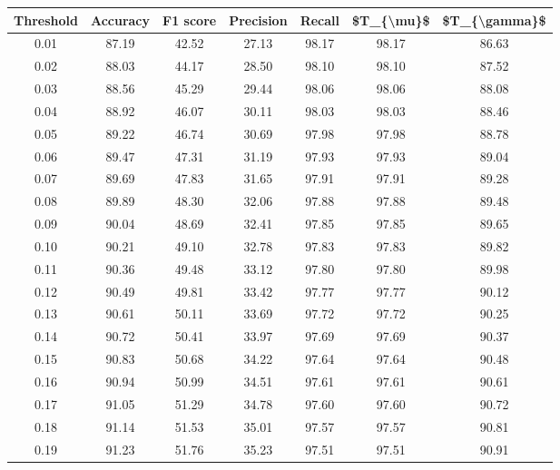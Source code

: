 \begin{tabular}{|c|c|c|c|c|c|c|}
\hline
 Threshold &  Accuracy &  F1 score &  Precision &  Recall &  \$T\_\{\textbackslash mu\}\$ &  \$T\_\{\textbackslash gamma\}\$ \\
\hline
      0.01 &     87.19 &     42.52 &      27.13 &   98.17 &      98.17 &         86.63 \\
      0.02 &     88.03 &     44.17 &      28.50 &   98.10 &      98.10 &         87.52 \\
      0.03 &     88.56 &     45.29 &      29.44 &   98.06 &      98.06 &         88.08 \\
      0.04 &     88.92 &     46.07 &      30.11 &   98.03 &      98.03 &         88.46 \\
      0.05 &     89.22 &     46.74 &      30.69 &   97.98 &      97.98 &         88.78 \\
      0.06 &     89.47 &     47.31 &      31.19 &   97.93 &      97.93 &         89.04 \\
      0.07 &     89.69 &     47.83 &      31.65 &   97.91 &      97.91 &         89.28 \\
      0.08 &     89.89 &     48.30 &      32.06 &   97.88 &      97.88 &         89.48 \\
      0.09 &     90.04 &     48.69 &      32.41 &   97.85 &      97.85 &         89.65 \\
      0.10 &     90.21 &     49.10 &      32.78 &   97.83 &      97.83 &         89.82 \\
      0.11 &     90.36 &     49.48 &      33.12 &   97.80 &      97.80 &         89.98 \\
      0.12 &     90.49 &     49.81 &      33.42 &   97.77 &      97.77 &         90.12 \\
      0.13 &     90.61 &     50.11 &      33.69 &   97.72 &      97.72 &         90.25 \\
      0.14 &     90.72 &     50.41 &      33.97 &   97.69 &      97.69 &         90.37 \\
      0.15 &     90.83 &     50.68 &      34.22 &   97.64 &      97.64 &         90.48 \\
      0.16 &     90.94 &     50.99 &      34.51 &   97.61 &      97.61 &         90.61 \\
      0.17 &     91.05 &     51.29 &      34.78 &   97.60 &      97.60 &         90.72 \\
      0.18 &     91.14 &     51.53 &      35.01 &   97.57 &      97.57 &         90.81 \\
      0.19 &     91.23 &     51.76 &      35.23 &   97.51 &      97.51 &         90.91 \\

\end{tabular}
